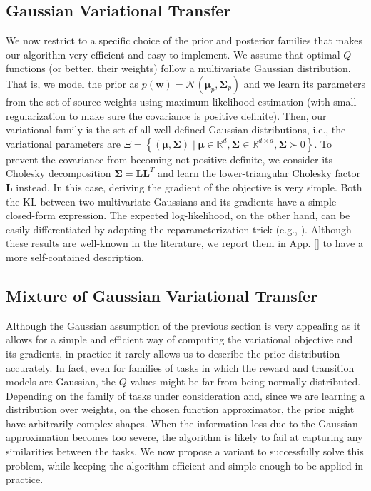 \documentclass{article}
\begin{document}
\subsection{Gaussian Variational Transfer}\label{sec:gvt}

We now restrict to a specific choice of the prior and posterior families that makes our algorithm very efficient and easy to implement. We assume that optimal $Q$-functions (or better, their weights) follow a multivariate Gaussian distribution. That is, we model the prior as $p(\bm{w}) = \mathcal{N}(\bm{\mu}_p,\bm{\Sigma}_p)$ and we learn its parameters from the set of source weights using maximum likelihood estimation (with small regularization to make sure the covariance is positive definite). Then, our variational family is the set of all well-defined Gaussian distributions, i.e., the variational parameters are $\Xi = \left\{ (\bm{\mu},\bm{\Sigma}) \mid \bm{\mu}\in\mathbb{R}^d, \bm{\Sigma}\in\mathbb{R}^{d\times d}, \bm{\Sigma}\succ 0 \right\}$. To prevent the covariance from becoming not positive definite, we consider its Cholesky decomposition $\bm{\Sigma} = \bm{LL}^T$ and learn the lower-triangular Cholesky factor $\bm{L}$ instead. In this case, deriving the gradient of the objective is very simple. Both the KL between two multivariate Gaussians and its gradients have a simple closed-form expression. The expected log-likelihood, on the other hand, can be easily differentiated by adopting the reparameterization trick (e.g., \cite{hoffman2013stochastic,rezende2014stochastic}). Although these results are well-known in the literature, we report them in App. \ref{} to have a more self-contained description.

\subsection{Mixture of Gaussian Variational Transfer}\label{sec:mgvt}

Although the Gaussian assumption of the previous section is very appealing as it allows for a simple and efficient way of computing the variational objective and its gradients, in practice it rarely allows us to describe the prior distribution accurately. In fact, even for families of tasks in which the reward and transition models are Gaussian, the $Q$-values might be far from being normally distributed. Depending on the family of tasks under consideration and, since we are learning a distribution over weights, on the chosen function approximator, the prior might have arbitrarily complex shapes. When the information loss due to the Gaussian approximation becomes too severe, the algorithm is likely to fail at capturing any similarities between the tasks. We now propose a variant to successfully solve this problem, while keeping the algorithm efficient and simple enough to be applied in practice.
\end{document}
